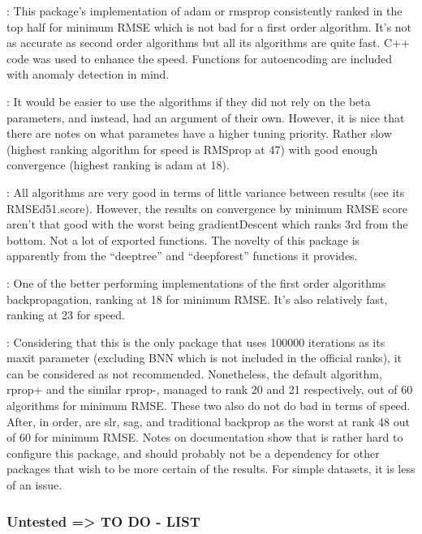  \citep{R-ANN2}: This package's implementation of adam or
rmsprop consistently ranked in the top half for minimum RMSE which is
not bad for a first order algorithm. It's not as accurate as second
order algorithms but all its algorithms are quite fast. C++ code was
used to enhance the speed. Functions for autoencoding are included with
anomaly detection in mind.

 \citep{R-automl}: It would be easier to use the
algorithms if they did not rely on the beta parameters, and instead, had
an argument of their own. However, it is nice that there are notes on
what parametes have a higher tuning priority. Rather slow (highest
ranking algorithm for speed is RMSprop at 47) with good enough
convergence (highest ranking is adam at 18).

 \citep{R-deepdive}: All algorithms are very good in
terms of little variance between results (see its RMSEd51.score).
However, the results on convergence by minimum RMSE score aren't that
good with the worst being gradientDescent which ranks 3rd from the
bottom. Not a lot of exported functions. The novelty of this package is
apparently from the ``deeptree'' and ``deepforest'' functions it
provides.

 \citep{R-deepnet}: One of the better performing
implementations of the first order algorithms backpropagation, ranking
at 18 for minimum RMSE. It's also relatively fast, ranking at 23 for
speed.

 \citep{R-neuralnet}: Considering that this is the
only package that uses 100000 iterations as its maxit parameter
(excluding BNN which is not included in the official ranks), it can be
considered as not recommended. Nonetheless, the default algorithm,
rprop+ and the similar rprop-, managed to rank 20 and 21 respectively,
out of 60 algorithms for minimum RMSE. These two also do not do bad in
terms of speed. After, in order, are slr, sag, and traditional backprop
as the worst at rank 48 out of 60 for minimum RMSE. Notes on
documentation show that is rather hard to configure this package, and
should probably not be a dependency for other packages that wish to be
more certain of the results. For simple datasets, it is less of an
issue.

\hypertarget{untested-to-do---list}{%
\subsubsection{Untested =\textgreater{} TO DO -
LIST}\label{untested-to-do---list}}

